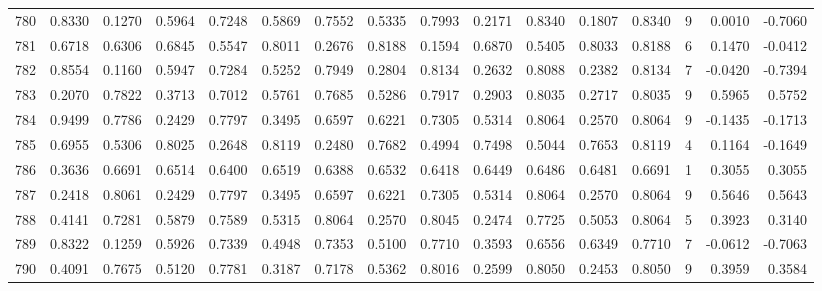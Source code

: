 \begin{tabular}{lrrrrrrrrrrrrrrr}
780 &      0.8330 &  0.1270 &  0.5964 &  0.7248 &  0.5869 &  0.7552 &  0.5335 &  0.7993 &  0.2171 &  0.8340 &   0.1807 &     0.8340 &      9 &                    0.0010 &                    -0.7060 \\
781 &      0.6718 &  0.6306 &  0.6845 &  0.5547 &  0.8011 &  0.2676 &  0.8188 &  0.1594 &  0.6870 &  0.5405 &   0.8033 &     0.8188 &      6 &                    0.1470 &                    -0.0412 \\
782 &      0.8554 &  0.1160 &  0.5947 &  0.7284 &  0.5252 &  0.7949 &  0.2804 &  0.8134 &  0.2632 &  0.8088 &   0.2382 &     0.8134 &      7 &                   -0.0420 &                    -0.7394 \\
783 &      0.2070 &  0.7822 &  0.3713 &  0.7012 &  0.5761 &  0.7685 &  0.5286 &  0.7917 &  0.2903 &  0.8035 &   0.2717 &     0.8035 &      9 &                    0.5965 &                     0.5752 \\
784 &      0.9499 &  0.7786 &  0.2429 &  0.7797 &  0.3495 &  0.6597 &  0.6221 &  0.7305 &  0.5314 &  0.8064 &   0.2570 &     0.8064 &      9 &                   -0.1435 &                    -0.1713 \\
785 &      0.6955 &  0.5306 &  0.8025 &  0.2648 &  0.8119 &  0.2480 &  0.7682 &  0.4994 &  0.7498 &  0.5044 &   0.7653 &     0.8119 &      4 &                    0.1164 &                    -0.1649 \\
786 &      0.3636 &  0.6691 &  0.6514 &  0.6400 &  0.6519 &  0.6388 &  0.6532 &  0.6418 &  0.6449 &  0.6486 &   0.6481 &     0.6691 &      1 &                    0.3055 &                     0.3055 \\
787 &      0.2418 &  0.8061 &  0.2429 &  0.7797 &  0.3495 &  0.6597 &  0.6221 &  0.7305 &  0.5314 &  0.8064 &   0.2570 &     0.8064 &      9 &                    0.5646 &                     0.5643 \\
788 &      0.4141 &  0.7281 &  0.5879 &  0.7589 &  0.5315 &  0.8064 &  0.2570 &  0.8045 &  0.2474 &  0.7725 &   0.5053 &     0.8064 &      5 &                    0.3923 &                     0.3140 \\
789 &      0.8322 &  0.1259 &  0.5926 &  0.7339 &  0.4948 &  0.7353 &  0.5100 &  0.7710 &  0.3593 &  0.6556 &   0.6349 &     0.7710 &      7 &                   -0.0612 &                    -0.7063 \\
790 &      0.4091 &  0.7675 &  0.5120 &  0.7781 &  0.3187 &  0.7178 &  0.5362 &  0.8016 &  0.2599 &  0.8050 &   0.2453 &     0.8050 &      9 &                    0.3959 &                     0.3584 \\

\end{tabular}
